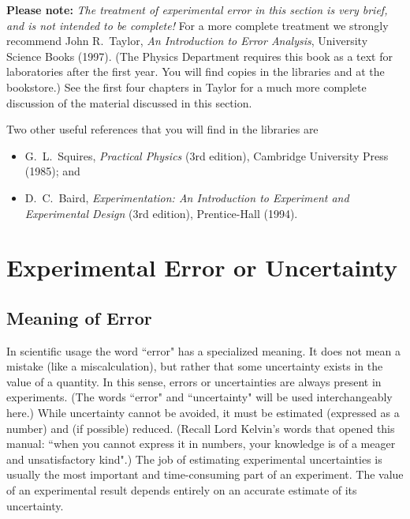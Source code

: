 \newapp

{\bf Please note:} {\em The treatment of experimental error in this
section is very brief, and is not intended to be complete!} For a more
complete treatment we strongly recommend John R.~Taylor, {\em An
Introduction to Error Analysis}, University Science Books (1997).
(The Physics Department requires this book as a text for laboratories
after the first year.  You will find copies in the libraries and at
the bookstore.) See the first four chapters in Taylor for a much more
complete discussion of the material discussed in this section.

Two other useful references that you will find in the libraries are
\begin{itemize}
\item G.\ L.\ Squires, {\em Practical Physics} (3rd edition),
Cambridge University Press (1985); and
\item D.\ C.\ Baird, {\em Experimentation: An Introduction to
Experiment and Experimental Design} (3rd edition), Prentice-Hall
(1994).
\end{itemize}

\section*{Experimental Error or Uncertainty}
\label{scierror}

\subsection*{Meaning of Error}
     In scientific usage the word ``error" has a specialized
meaning.  It does not mean a mistake (like a miscalculation), 
but rather that some uncertainty exists in the value of
a quantity.   In this sense, errors or
uncertainties are always present in experiments.  
(The words ``error" and ``uncertainty" will be
used interchangeably here.)  While uncertainty cannot be
avoided, it must be estimated (expressed as a number) and (if possible) reduced.  
(Recall Lord Kelvin's words that opened this manual: 
``when you cannot express it in numbers, your knowledge is of a meager and
unsatisfactory kind".)   The job of estimating experimental uncertainties is
usually the most important and time-consuming part of an
experiment.  The value of an experimental result depends entirely
on an accurate estimate of its uncertainty.

